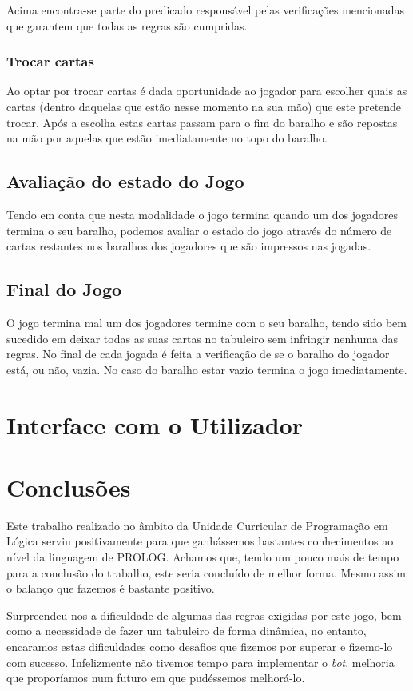 \documentclass[a4paper]{article}
\begin{document}
	Acima encontra-se parte do predicado responsável pelas verificações mencionadas que garantem que todas as regras são cumpridas.

	\subsubsection{Trocar cartas}

	Ao optar por trocar cartas é dada oportunidade ao jogador para escolher quais as cartas (dentro daquelas que estão nesse momento na sua mão) que este pretende trocar. Após a escolha estas cartas passam para o fim do baralho e são repostas na mão por aquelas que estão imediatamente no topo do baralho.

	\subsection{Avaliação do estado do Jogo}

	Tendo em conta que nesta modalidade o jogo termina quando um dos jogadores termina o seu baralho, podemos avaliar o estado do jogo através do número de cartas restantes nos baralhos dos jogadores que são impressos nas jogadas.

	\subsection{Final do Jogo}

	O jogo termina mal um dos jogadores termine com o seu baralho, tendo sido bem sucedido em deixar todas as suas cartas no tabuleiro sem infringir nenhuma das regras. No final de cada jogada é feita a verificação de se o baralho do jogador está, ou não, vazia. No caso do baralho estar vazio termina o jogo imediatamente.

	\newpage

	\section{Interface com o Utilizador}

	\clearpage

	\section{Conclusões}

	Este trabalho realizado no âmbito da Unidade Curricular de Programação em Lógica serviu positivamente para que ganhássemos bastantes conhecimentos ao nível da linguagem de PROLOG. Achamos que, tendo um pouco mais de tempo para a conclusão do trabalho, este seria concluído de melhor forma. Mesmo assim o balanço que fazemos é bastante positivo.

	Surpreendeu-nos a dificuldade de algumas das regras exigidas por este jogo, bem como a necessidade de fazer um tabuleiro de forma dinâmica, no entanto, encaramos estas dificuldades como desafios que fizemos por superar e fizemo-lo com sucesso. Infelizmente não tivemos tempo para implementar o \textit{bot}, melhoria que proporíamos num futuro em que pudéssemos melhorá-lo.



	
\end{document}
